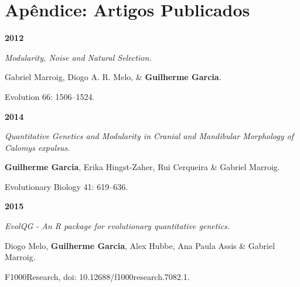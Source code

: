 \chapter*{Apêndice: Artigos Publicados}

\textbf {2012}

\textit {Modularity, Noise and Natural Selection.}

Gabriel Marroig, Diogo A. R. Melo, \& \textbf {Guilherme Garcia}.  

Evolution 66: 1506–1524.

\vspace {0.3 cm}

\textbf{2014}

\textit{Quantitative Genetics and Modularity in Cranial and Mandibular Morphology of \emph{Calomys expulsus}}.

\textbf {Guilherme Garcia}, Erika Hingst-Zaher, Rui Cerqueira \& Gabriel Marroig.

Evolutionary Biology 41: 619–636.

\vspace {0.3 cm}

\textbf{2015}

\textit {EvolQG - An R package for evolutionary quantitative genetics.}

Diogo Melo, \textbf{Guilherme Garcia}, Alex Hubbe, Ana Paula Assis \& Gabriel Marroig.  

F1000Research, doi: 10.12688/f1000research.7082.1.





